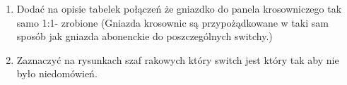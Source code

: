 \documentclass{report}
\begin{document}
\begin{enumerate}
 \item Dodać na opisie tabelek połączeń że gniazdko do panela krosowniczego tak samo 1:1- zrobione (Gniazda krosownic są przypożądkowane w taki sam sposób jak gniazda abonenckie do poszczególnych switchy.)
\item Zaznaczyć na rysunkach szaf rakowych który switch jest który tak aby nie było niedomówień.
\end{enumerate}

 
\end{document}
